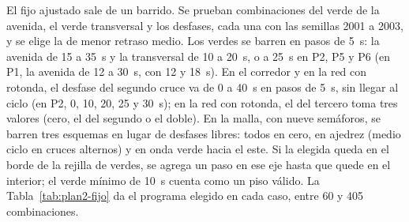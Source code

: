 El fijo ajustado sale de un barrido. Se prueban combinaciones del verde
de la avenida, el verde transversal y los desfases, cada una con las
semillas 2001 a 2003, y se elige la de menor retraso medio. Los verdes
se barren en pasos de 5~s: la avenida de 15 a 35~s y la transversal de
10 a 20~s, o a 25~s en P2, P5 y P6 (en P1, la avenida de 12 a 30~s,
con 12 y 18~s). En el corredor y en la red con rotonda, el desfase del
segundo cruce va de 0 a 40~s en pasos de 5~s, sin llegar al ciclo (en
P2, 0, 10, 20, 25 y 30~s); en la red con rotonda, el del tercero toma
tres valores (cero, el del segundo o el doble). En la malla, con nueve semáforos, se barren tres esquemas en
lugar de desfases libres: todos en cero, en ajedrez (medio ciclo en
cruces alternos) y en onda verde hacia el este.
Si la elegida queda en el borde de la rejilla de verdes, se agrega un
paso en ese eje hasta que quede en el interior; el verde mínimo de
10~s cuenta como un piso válido. La Tabla~\ref{tab:plan2-fijo} da el
programa elegido en cada caso, entre 60 y 405 combinaciones.

